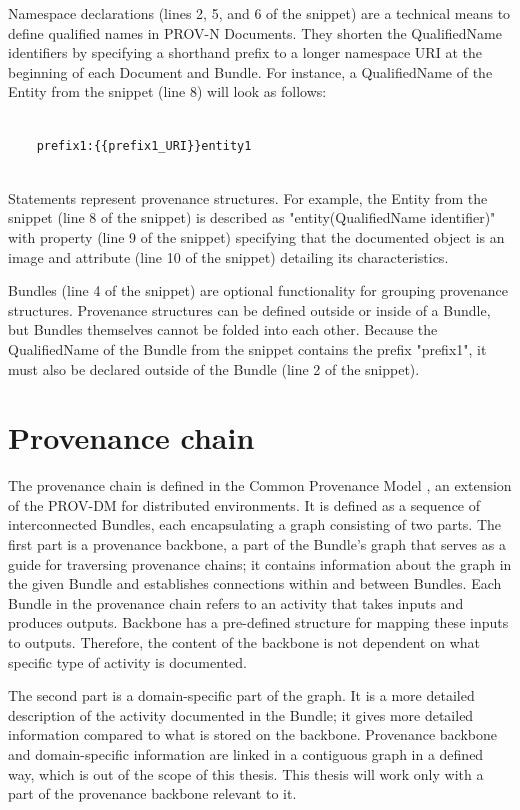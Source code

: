 \documentclass[
  digital,     %
  oneside,     %
  nosansbold,  %
  nocolorbold, %
  lof,         %
  lot,         %
]{fithesis4}
\begin{document}
Namespace declarations (lines 2, 5, and 6 of the snippet) are a technical means to define qualified names in PROV-N Documents. They shorten the QualifiedName identifiers by specifying a shorthand prefix to a longer namespace URI at the beginning of each Document and Bundle. For instance, a QualifiedName of the Entity from the snippet (line 8) will look as follows:

\begin{verbatim}

    prefix1:{{prefix1_URI}}entity1
    
\end{verbatim}

Statements represent provenance structures. For example, the Entity from the snippet (line 8 of the snippet) is described as "entity(QualifiedName identifier)" with property (line 9 of the snippet) specifying that the documented object is an image and attribute (line 10 of the snippet) detailing its characteristics.

Bundles (line 4 of the snippet) are optional functionality for grouping provenance structures. Provenance structures can be defined outside or inside of a Bundle, but Bundles themselves cannot be folded into each other. Because the QualifiedName of the Bundle from the snippet contains the prefix "prefix1", it must also be declared outside of the Bundle (line 2 of the snippet).
\shorthandon{-}

\section{Provenance chain} \label{s-provchain}
\shorthandoff{-}
The provenance chain is defined in the Common Provenance Model \cite{cpm}, an extension of the PROV-DM for distributed environments. It is defined as a sequence of interconnected Bundles, each encapsulating a graph consisting of two parts. The first part is a provenance backbone, a part of the Bundle's graph that serves as a guide for traversing provenance chains; it contains information about the graph in the given Bundle and establishes connections within and between Bundles. Each Bundle in the provenance chain refers to an activity that takes inputs and produces outputs. Backbone has a pre-defined structure for mapping these inputs to outputs. Therefore, the content of the backbone is not dependent on what specific type of activity is documented.

The second part is a domain-specific part of the graph. It is a more detailed description of the activity documented in the Bundle; it gives more detailed information compared to what is stored on the backbone. Provenance backbone and domain-specific information are linked in a contiguous graph in a defined way, which is out of the scope of this thesis. This thesis will work only with a part of the provenance backbone relevant to it.
\end{document}
